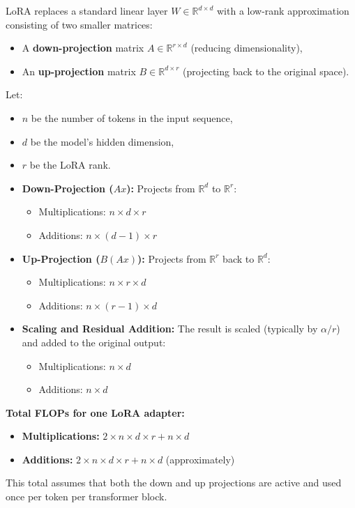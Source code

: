 \documentclass[a4paper,12pt]{article}
\begin{document}
LoRA replaces a standard linear layer $W \in \mathbb{R}^{d \times d}$ with a low-rank approximation consisting of two smaller matrices:
\begin{itemize}
  \item A \textbf{down-projection} matrix $A \in \mathbb{R}^{r \times d}$ (reducing dimensionality),
  \item An \textbf{up-projection} matrix $B \in \mathbb{R}^{d \times r}$ (projecting back to the original space).
\end{itemize}

Let:
\begin{itemize}
  \item $n$ be the number of tokens in the input sequence,
  \item $d$ be the model's hidden dimension,
  \item $r$ be the LoRA rank.
\end{itemize}

\begin{itemize}
  \item \textbf{Down-Projection ($A x$):} Projects from $\mathbb{R}^{d}$ to $\mathbb{R}^{r}$:
  \begin{itemize}
    \item Multiplications: $n \times d \times r$
    \item Additions: $n \times (d - 1) \times r$
  \end{itemize}

  \item \textbf{Up-Projection ($B (A x)$):} Projects from $\mathbb{R}^{r}$ back to $\mathbb{R}^{d}$:
  \begin{itemize}
    \item Multiplications: $n \times r \times d$
    \item Additions: $n \times (r - 1) \times d$
  \end{itemize}

  \item \textbf{Scaling and Residual Addition:} The result is scaled (typically by $\alpha / r$) and added to the original output:
  \begin{itemize}
    \item Multiplications: $n \times d$
    \item Additions: $n \times d$
  \end{itemize}
\end{itemize}

\textbf{Total FLOPs for one LoRA adapter:}
\begin{itemize}
  \item \textbf{Multiplications:} $2 \times n \times d \times r + n \times d$
  \item \textbf{Additions:} $2 \times n \times d \times r + n \times d$ (approximately)
\end{itemize}
This total assumes that both the down and up projections are active and used once per token per transformer block.
\end{document}
